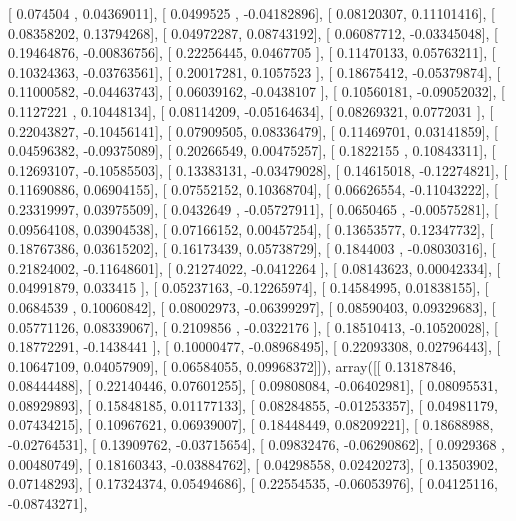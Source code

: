 \documentclass{article}
\begin{document}
       [ 0.074504  ,  0.04369011],
       [ 0.0499525 , -0.04182896],
       [ 0.08120307,  0.11101416],
       [ 0.08358202,  0.13794268],
       [ 0.04972287,  0.08743192],
       [ 0.06087712, -0.03345048],
       [ 0.19464876, -0.00836756],
       [ 0.22256445,  0.0467705 ],
       [ 0.11470133,  0.05763211],
       [ 0.10324363, -0.03763561],
       [ 0.20017281,  0.1057523 ],
       [ 0.18675412, -0.05379874],
       [ 0.11000582, -0.04463743],
       [ 0.06039162, -0.0438107 ],
       [ 0.10560181, -0.09052032],
       [ 0.1127221 ,  0.10448134],
       [ 0.08114209, -0.05164634],
       [ 0.08269321,  0.0772031 ],
       [ 0.22043827, -0.10456141],
       [ 0.07909505,  0.08336479],
       [ 0.11469701,  0.03141859],
       [ 0.04596382, -0.09375089],
       [ 0.20266549,  0.00475257],
       [ 0.1822155 ,  0.10843311],
       [ 0.12693107, -0.10585503],
       [ 0.13383131, -0.03479028],
       [ 0.14615018, -0.12274821],
       [ 0.11690886,  0.06904155],
       [ 0.07552152,  0.10368704],
       [ 0.06626554, -0.11043222],
       [ 0.23319997,  0.03975509],
       [ 0.0432649 , -0.05727911],
       [ 0.0650465 , -0.00575281],
       [ 0.09564108,  0.03904538],
       [ 0.07166152,  0.00457254],
       [ 0.13653577,  0.12347732],
       [ 0.18767386,  0.03615202],
       [ 0.16173439,  0.05738729],
       [ 0.1844003 , -0.08030316],
       [ 0.21824002, -0.11648601],
       [ 0.21274022, -0.0412264 ],
       [ 0.08143623,  0.00042334],
       [ 0.04991879,  0.033415  ],
       [ 0.05237163, -0.12265974],
       [ 0.14584995,  0.01838155],
       [ 0.0684539 ,  0.10060842],
       [ 0.08002973, -0.06399297],
       [ 0.08590403,  0.09329683],
       [ 0.05771126,  0.08339067],
       [ 0.2109856 , -0.0322176 ],
       [ 0.18510413, -0.10520028],
       [ 0.18772291, -0.1438441 ],
       [ 0.10000477, -0.08968495],
       [ 0.22093308,  0.02796443],
       [ 0.10647109,  0.04057909],
       [ 0.06584055,  0.09968372]]), array([[ 0.13187846,  0.08444488],
       [ 0.22140446,  0.07601255],
       [ 0.09808084, -0.06402981],
       [ 0.08095531,  0.08929893],
       [ 0.15848185,  0.01177133],
       [ 0.08284855, -0.01253357],
       [ 0.04981179,  0.07434215],
       [ 0.10967621,  0.06939007],
       [ 0.18448449,  0.08209221],
       [ 0.18688988, -0.02764531],
       [ 0.13909762, -0.03715654],
       [ 0.09832476, -0.06290862],
       [ 0.0929368 ,  0.00480749],
       [ 0.18160343, -0.03884762],
       [ 0.04298558,  0.02420273],
       [ 0.13503902,  0.07148293],
       [ 0.17324374,  0.05494686],
       [ 0.22554535, -0.06053976],
       [ 0.04125116, -0.08743271],
\end{document}
